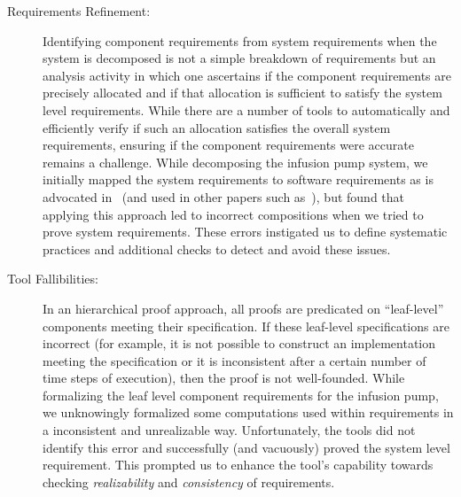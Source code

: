 \begin{description}
    \item[Requirements Refinement:] Identifying component requirements from system requirements when the system is decomposed is not a simple breakdown of requirements but an analysis activity in which one ascertains if the component requirements are precisely allocated and if that allocation is sufficient to satisfy the system level requirements. While there are a number of tools to automatically and efficiently verify if such an allocation satisfies the overall system requirements, ensuring if the component requirements were accurate remains a challenge. While decomposing the infusion pump system, we initially mapped the system requirements to software requirements as is advocated in~\cite{Miller01:dasc} (and used in other papers such as~\cite{Jeffords:2010:MCV:1938390.1938407,Kauppinen07:re}), but found that applying this approach led to incorrect compositions when we tried to prove system requirements. These errors instigated us to define systematic practices and additional checks to detect and avoid these issues.
    \item[Tool Fallibilities:] In an hierarchical proof approach, all proofs are predicated on ``leaf-level'' components meeting their specification.  If these leaf-level specifications are incorrect (for example, it is not possible to construct an implementation meeting the specification or it is inconsistent after a certain number of time steps of execution), then the proof is not well-founded. While formalizing the leaf level component requirements for the infusion pump, we unknowingly formalized some computations used within requirements in a inconsistent and unrealizable way. Unfortunately, the tools did not identify this error and successfully (and vacuously) proved the system level requirement. This prompted us to enhance the tool's capability towards checking {\em realizability} and {\em consistency} of requirements.

\end{description}
